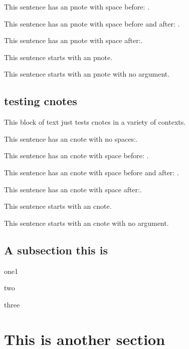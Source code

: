 \documentclass[final]{compact_proposal}
\begin{document}
This sentence has an pnote with space before: .

This sentence has an pnote with space before and after:  .

This sentence has an pnote with space after: .

 This sentence starts with an pnote.

\pnote This sentence starts with an pnote with no argument.

\subsection{testing cnotes}

This block of text just tests cnotes in a variety of contexts.

This sentence has an cnote with no spaces:.

This sentence has an cnote with space before: .

This sentence has an cnote with space before and after:  .

This sentence has an cnote with space after: .

 This sentence starts with an cnote.

\cnote This sentence starts with an cnote with no argument.

\subsection{A subsection this is}
\blindtext[1]
\begin{tightitemize}
	\item one1
	\item two
	\item three
\end{tightitemize}

\section{This is another section}
\blindtext[6]
\end{document}
